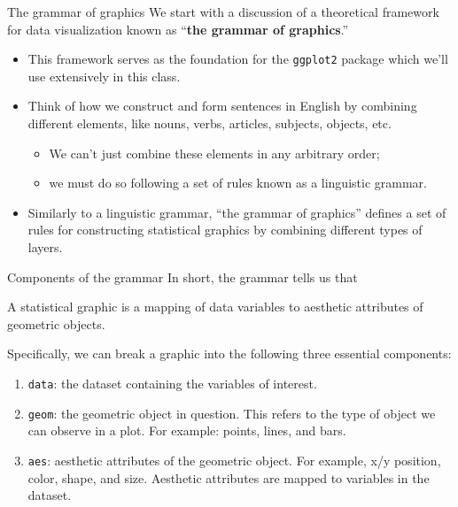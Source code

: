 \documentclass[
  ignorenonframetext,
]{beamer}
\providecommand{\tightlist}{%
  \setlength{\itemsep}{0pt}\setlength{\parskip}{0pt}}
\begin{document}
\begin{frame}[fragile]{The grammar of graphics}
\protect\hypertarget{the-grammar-of-graphics}{}
We start with a discussion of a theoretical framework for data
visualization known as ``\textbf{the grammar of graphics}.''

\begin{itemize}
\item
  This framework serves as the foundation for the \texttt{ggplot2}
  package which we'll use extensively in this class.
\item
  Think of how we construct and form sentences in English by combining
  different elements, like nouns, verbs, articles, subjects, objects,
  etc.

  \begin{itemize}
  \tightlist
  \item
    We can't just combine these elements in any arbitrary order;
  \item
    we must do so following a set of rules known as a linguistic
    grammar.
  \end{itemize}
\item
  Similarly to a linguistic grammar, ``the grammar of graphics'' defines
  a set of rules for constructing statistical graphics by combining
  different types of layers.
\end{itemize}
\end{frame}

\begin{frame}[fragile]{Components of the grammar}
\protect\hypertarget{components-of-the-grammar}{}
In short, the grammar tells us that

\begin{tcolorbox}
A statistical graphic is a mapping of data variables to aesthetic attributes of geometric objects.

\end{tcolorbox}

Specifically, we can break a graphic into the following three essential
components:

\begin{enumerate}
\item
  \texttt{data}: the dataset containing the variables of interest.
\item
  \texttt{geom}: the geometric object in question. This refers to the
  type of object we can observe in a plot. For example: points, lines,
  and bars.
\item
  \texttt{aes}: aesthetic attributes of the geometric object. For
  example, x/y position, color, shape, and size. Aesthetic attributes
  are mapped to variables in the dataset.
\end{enumerate}
\end{frame}
\end{document}

